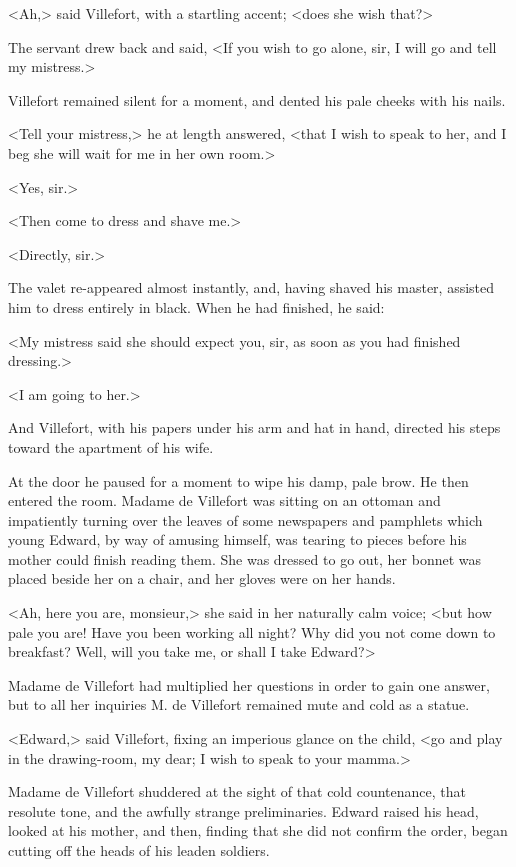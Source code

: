  <Ah,> said Villefort, with a startling accent; <does she wish that?> 

 The servant drew back and said, <If you wish to go alone, sir, I will go and tell my mistress.> 

 Villefort remained silent for a moment, and dented his pale cheeks with his nails. 

 <Tell your mistress,> he at length answered, <that I wish to speak to her, and I beg she will wait for me in her own room.> 

 <Yes, sir.> 

 <Then come to dress and shave me.> 

 <Directly, sir.> 

 The valet re-appeared almost instantly, and, having shaved his master, assisted him to dress entirely in black. When he had finished, he said: 

 <My mistress said she should expect you, sir, as soon as you had finished dressing.> 

 <I am going to her.> 

 And Villefort, with his papers under his arm and hat in hand, directed his steps toward the apartment of his wife. 

 At the door he paused for a moment to wipe his damp, pale brow. He then entered the room. Madame de Villefort was sitting on an ottoman and impatiently turning over the leaves of some newspapers and pamphlets which young Edward, by way of amusing himself, was tearing to pieces before his mother could finish reading them. She was dressed to go out, her bonnet was placed beside her on a chair, and her gloves were on her hands. 

 <Ah, here you are, monsieur,> she said in her naturally calm voice; <but how pale you are! Have you been working all night? Why did you not come down to breakfast? Well, will you take me, or shall I take Edward?> 

 Madame de Villefort had multiplied her questions in order to gain one answer, but to all her inquiries M. de Villefort remained mute and cold as a statue. 

 <Edward,> said Villefort, fixing an imperious glance on the child, <go and play in the drawing-room, my dear; I wish to speak to your mamma.> 

 Madame de Villefort shuddered at the sight of that cold countenance, that resolute tone, and the awfully strange preliminaries. Edward raised his head, looked at his mother, and then, finding that she did not confirm the order, began cutting off the heads of his leaden soldiers. 

